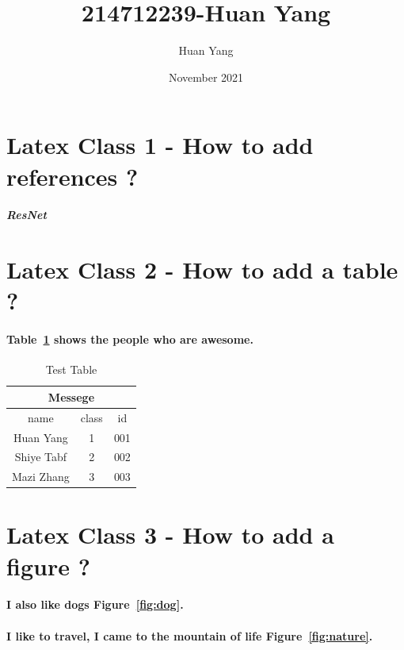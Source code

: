 \documentclass{article}
\title{214712239-Huan Yang}
\author{Huan Yang}
\date{November 2021}
\begin{document}
\maketitle


\section{Latex Class 1 - How to add references ?}

\subparagraph{ResNet \cite{DBLP:journals/corr/HeZRS15}} 


\section{Latex Class 2 - How to add a table ?}
\paragraph{Table~\ref{tab:my_label} shows the people who are awesome.}
\begin{table}[htbp]\large

    \centering
    \begin{tabular}{|c c c|}
        \hline
        \multicolumn{3}{|c|}{Messege}\\
        \hline
        name & class & id \\ 
        \hline
        Huan Yang & 1 & 001 \\
        Shiye Tabf & 2 & 002 \\
        Mazi Zhang & 3 & 003 \\
        \hline

    \end{tabular}
     \caption{Test Table}
    \label{tab:my_label}
\end{table}

\section{Latex Class 3 - How to add a figure ?}
\paragraph{I also like dogs Figure~\ref{fig:dog}. }
\paragraph{I like to travel, I came to the mountain of life Figure~\ref{fig:nature}. }
\end{document}
